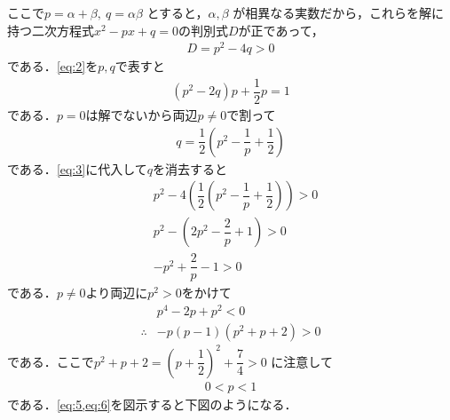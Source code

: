 \documentclass[../../main.tex]{subfiles}
\begin{document}
ここで$p = \alpha + \beta, \ q = \alpha \beta$ とすると，$\alpha, \beta$ が相異なる実数だから，これらを解に持つ二次方程式$x^2-px+q=0$の判別式$D$が正であって，
\begin{align}
  D = p^2 - 4q > 0 \label{eq:3}
\end{align}
である．\cref{eq:2}を$p,q$で表すと
\begin{align}
  (p^2 - 2q)p + \dfrac{1}{2}p = 1 \label{eq:4}
\end{align}
である．$p=0$は解でないから両辺$p\neq 0$で割って
\begin{align}
  q = \dfrac{1}{2} \left( p^2 - \dfrac{1}{p} + \dfrac{1}{2} \right) \label{eq:5}
\end{align}
である．\cref{eq:3}に代入して$q$を消去すると
\begin{align}
  & p^2 - 4 \left( \dfrac{1}{2}(p^2 - \dfrac{1}{p} + \dfrac{1}{2}) \right) > 0 \\
  & p^2 - \left(2p^2 - \dfrac{2}{p} + 1 \right) > 0 \\
  & - p^2 + \dfrac{2}{p} - 1 > 0
\end{align}
である．$p \neq 0$より両辺に$p^2>0$をかけて
\begin{align}
  & p^4 - 2p +p^2 < 0 \\
  \therefore
  & -p(p-1)(p^2+p+2) > 0
\end{align}
である．ここで$p^2+p+2 = (p+\dfrac{1}{2})^2 + \dfrac{7}{4} > 0$ に注意して
\begin{align}
  0 < p < 1 \label{eq:6}
\end{align}
である．\cref{eq:5,eq:6}を図示すると下図のようになる．
\end{document}
